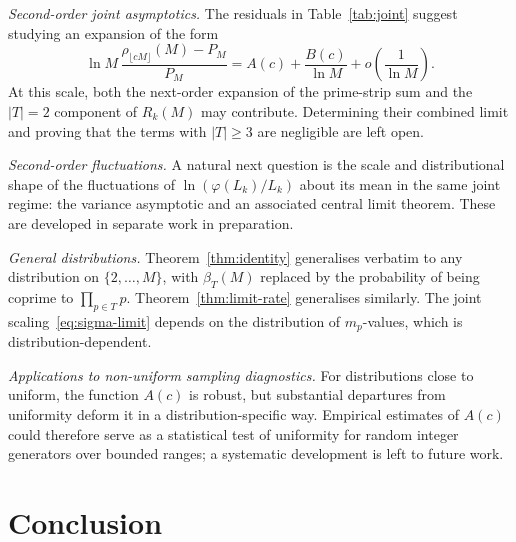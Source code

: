 \documentclass[11pt]{article}
\theoremstyle{remark}
\begin{document}
\emph{Second-order joint asymptotics.} The residuals in Table~\ref{tab:joint} suggest studying an expansion of the form
\[
\ln M\,\frac{\rho_{\lfloor cM\rfloor}(M)-P_M}{P_M}
= A(c)+\frac{B(c)}{\ln M}+o\!\left(\frac{1}{\ln M}\right).
\]
At this scale, both the next-order expansion of the prime-strip sum and the $|T|=2$ component of $R_k(M)$ may contribute. Determining their combined limit and proving that the terms with $|T|\geq 3$ are negligible are left open.

\emph{Second-order fluctuations.} A natural next question is the scale and distributional shape of the fluctuations of $\ln(\varphi(L_k)/L_k)$ about its mean in the same joint regime: the variance asymptotic and an associated central limit theorem. These are developed in separate work in preparation.

\emph{General distributions.} Theorem~\ref{thm:identity} generalises verbatim to any distribution on $\{2, \ldots, M\}$, with $\beta_T(M)$ replaced by the probability of being coprime to $\prod_{p \in T} p$. Theorem~\ref{thm:limit-rate} generalises similarly. The joint scaling~\eqref{eq:sigma-limit} depends on the distribution of $m_p$-values, which is distribution-dependent.

\emph{Applications to non-uniform sampling diagnostics.} For distributions close to uniform, the function $A(c)$ is robust, but substantial departures from uniformity deform it in a distribution-specific way. Empirical estimates of $A(c)$ could therefore serve as a statistical test of uniformity for random integer generators over bounded ranges; a systematic development is left to future work.

\section{Conclusion}\label{sec:conclusion}
\end{document}

